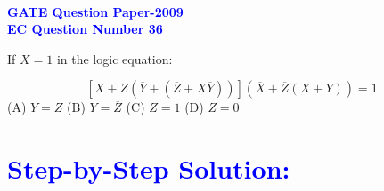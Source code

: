 \documentclass[a4paper,12pt]{article}
\begin{document}
\pagestyle{empty} %

\thispagestyle{fancy} %
\fancyhf{} %
\renewcommand{\headrulewidth}{0pt} %



\begin{center}
\vspace{2cm}
    {\LARGE \textbf{\textcolor{blue}{\\GATE Question Paper-2009}}}\\
    \vspace{0.5cm}
    {\Large\textbf{\textcolor{blue}{EC Question Number 36}}}
\end{center}

\vspace{0.2cm}
If $X = 1$ in the logic equation:

\[
\left[ X + Z \left( \overline{Y} + (\overline{Z} + X \overline{Y}) \right) \right] \left( \overline{X} + \overline{Z}(X + Y) \right) = 1
\]
\vspace{0.2cm}
\noindent
(A) $Y = Z$ \hfill
(B) $Y = \overline{Z}$ \hfill
(C) $Z = 1$ \hfill
(D) $Z = 0$


\vspace{0.3cm}

\section*{\textcolor{blue}{Step-by-Step Solution:}}

\vspace{0.3cm}
\end{document}

